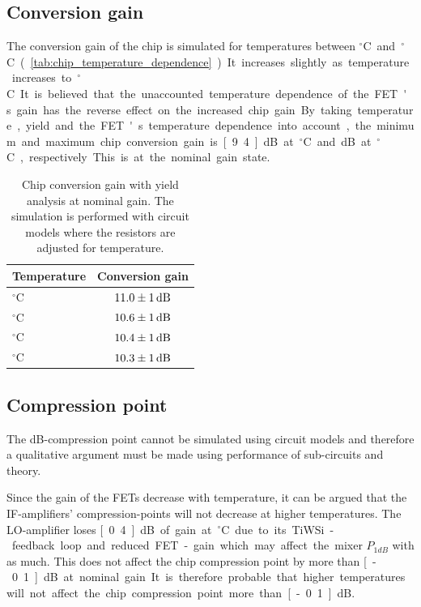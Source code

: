 		\subsection{Conversion gain}
			The conversion gain of the chip is simulated for temperatures between \unit[-40]{$^\circ$C} and \unit[85]{$^\circ$C} (\autoref{tab:chip_temperature_dependence}). It increases slightly as temperature increases to \unit[85]{$^\circ$C}. It is believed that the unaccounted temperature dependence of the FET's gain has the reverse effect on the increased chip gain.

			By taking temperature, yield and the FET's temperature dependence into account, the minimum and maximum chip conversion gain is \unit[9.4]{dB} at \unit[55]{$^\circ$C} and \unit[12]{dB} at \unit[-40]{$^\circ$C}, respectively. This is at the nominal gain state.

			\begin{table}[h!]
				\caption[Chip conversion gain temperature dependence]{Chip conversion gain with yield analysis at nominal gain. The simulation is performed with circuit models where the resistors are adjusted for temperature.}
				\label{tab:chip_temperature_dependence}
				\centering
				\begin{tabular}{ l c } \toprule %
					Temperature & Conversion gain \\\midrule
					\unit[-40]{$^\circ$C} 	& $\unit[11.0\pm1]{dB}$\\
					\unit[20]{$^\circ$C} 	& $\unit[10.6\pm1]{dB}$\\
					\unit[55]{$^\circ$C} 	& $\unit[10.4\pm1]{dB}$ \\
					\unit[85]{$^\circ$C}	& $\unit[10.3\pm1]{dB}$ \\\bottomrule
				\end{tabular}
			\end{table}


		\subsection{Compression point}
			The \unit[1]{dB}-compression point cannot be simulated using circuit models and therefore a qualitative argument must be made using performance of sub-circuits and theory.

			Since the gain of the FETs decrease with temperature, it can be argued that the IF-amplifiers' compression-points will not decrease at higher temperatures. The LO-amplifier loses \unit[0.4]{dB} of gain at \unit[55]{$^\circ$C} due to its TiWSi-feedback loop and reduced FET-gain which may affect the mixer $P_{1dB}$ with as much. This does not affect the chip compression point by more than \unit[-0.1]{dB} at nominal gain. It is therefore probable that higher temperatures will not affect the chip compression point more than \unit[-0.1]{dB}.


